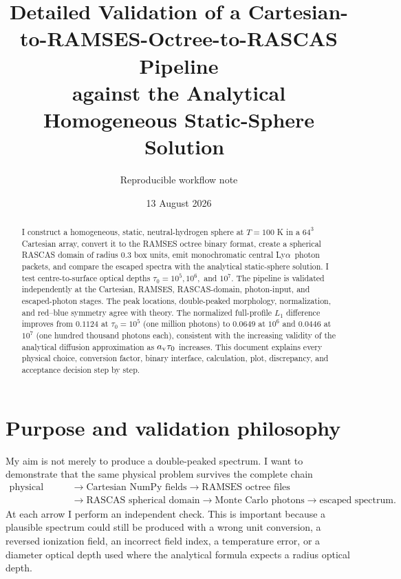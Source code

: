 \documentclass[11pt,a4paper]{article}
\title{Detailed Validation of a Cartesian-to-RAMSES-Octree-to-RASCAS Pipeline\\
against the Analytical Homogeneous Static-Sphere \lya\ Solution}
\author{Reproducible workflow note}
\date{13 August 2026}
\newcommand{\lya}{Ly$\alpha$}
\newcommand{\tauzero}{\tau_0}
\newcommand{\av}{a_{\rm v}}
\begin{document}
\maketitle

\begin{abstract}
I construct a homogeneous, static, neutral-hydrogen sphere at $T=100$ K in a
$64^3$ Cartesian array, convert it to the RAMSES octree binary format, create a
spherical RASCAS domain of radius $0.3$ box units, emit monochromatic central
\lya\ photon packets, and compare the escaped spectra with the analytical
static-sphere solution.  I test centre-to-surface optical depths
$\tauzero=10^5,10^6,$ and $10^7$.  The pipeline is validated independently at
the Cartesian, RAMSES, RASCAS-domain, photon-input, and escaped-photon stages.
The peak locations, double-peaked morphology, normalization, and red--blue
symmetry agree with theory.  The normalized full-profile $L_1$ difference
improves from $0.1124$ at $\tauzero=10^5$ (one million photons) to $0.0649$ at
$10^6$ and $0.0446$ at $10^7$ (one hundred thousand photons each), consistent
with the increasing validity of the analytical diffusion approximation as
$\av\tauzero$ increases.  This document explains every physical choice,
conversion factor, binary interface, calculation, plot, discrepancy, and
acceptance decision step by step.
\end{abstract}

\tableofcontents
\newpage

\section{Purpose and validation philosophy}

My aim is not merely to produce a double-peaked spectrum.  I want to demonstrate
that the same physical problem survives the complete chain
\begin{align*}
\text{physical target}&\longrightarrow \text{Cartesian NumPy fields}
\longrightarrow \text{RAMSES octree files}\\
&\longrightarrow \text{RASCAS spherical domain}
\longrightarrow \text{Monte Carlo photons}
\longrightarrow \text{escaped spectrum}.
\end{align*}
At each arrow I perform an independent check.  This is important because a
plausible spectrum could still be produced with a wrong unit conversion, a
reversed ionization field, an incorrect field index, a temperature error, or a
diameter optical depth used where the analytical formula expects a radius
optical depth.
\end{document}
